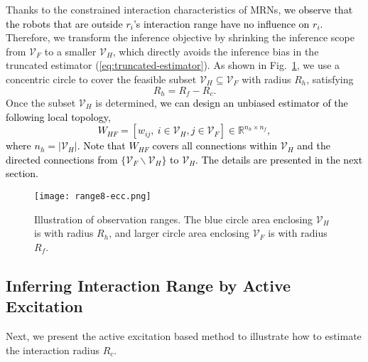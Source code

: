 \documentclass[12pt,journal,draftclsnofoot,onecolumn]{IEEEtran}
\let \sss=\scriptscriptstyle
\begin{document}
Thanks to the constrained interaction characteristics of MRNs, 
\textcolor{black}{we observe that the robots that are outside $r_i$'s interaction range have no influence on $r_i$. }
Therefore, we transform the inference objective by shrinking the inference scope from $\mathcal{V}_{\sss F}$ to a smaller $\mathcal{V}_{\sss H}$, which directly avoids the inference bias in the truncated estimator (\ref{eq:truncated-estimator}). 
As shown in Fig.~\ref{fig-range}, we use a concentric circle to cover the feasible subset $\mathcal{V}_{\sss H} \!\subseteq\! \mathcal{V}_{\sss F}$ with radius $R_h$, satisfying
\begin{equation}
R_h=R_f-R_c.
\end{equation}  
Once the subset $\mathcal{V}_{\sss H}$ is determined, 
\textcolor{black}{we can design an unbiased estimator of the following local topology,
\begin{equation}
W_{\sss HF}\!=\![w_{ij},~i\!\in\!\mathcal{V}_{\sss H},j\in\mathcal{V}_{\sss F}]\!\in\!\mathbb{R}^{n_h\times n_f},
\end{equation}
where $n_h=|\mathcal{V}_{\sss H} |$. 
Note that $W_{\sss HF}$ covers all connections within $\mathcal{V}_{\sss H}$ and the directed connections from $\{\mathcal{V}_{\sss F}\backslash\mathcal{V}_{\sss H}\}$ to $\mathcal{V}_{\sss H}$. 
The details are presented in the next section. }

\begin{figure}[t]
\centering
\setlength{\abovecaptionskip}{0.2cm}
\texttt{[image: range8-ecc.png]}
\caption{Illustration of observation ranges. 
The blue circle area enclosing $\mathcal{V}_{\sss H}$ is with radius $R_h$, and larger circle area enclosing $\mathcal{V}_{\sss F}$ is with radius $R_f$.}
\label{fig-range}
\vspace*{-8pt}
\end{figure}


\subsection{Inferring Interaction Range by Active Excitation}\label{sec:excitation}
Next, we present the active excitation based method to illustrate how to estimate the interaction radius $R_c$.
\end{document}
